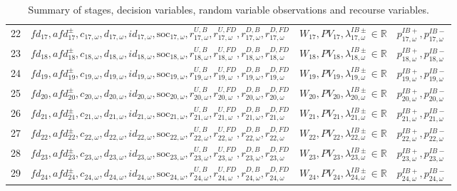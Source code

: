 \documentclass{article}
\newcommand{\R}{\mathbb{R}}
\newcommand{\soc}{\text{soc}}
\begin{document}
\begin{table}
\begin{tabular}{c c c c}
	22 & $fd_{17}, afd^{\pm}_{17}, c_{17, \omega}, d_{17, \omega}, id_{17, \omega}, \soc_{17, \omega}, r^{U, B}_{17, \omega}, r^{U, FD}_{17, \omega}, r^{D, B}_{17, \omega}, r^{D, FD}_{17, \omega}$ & $W_{17}, PV_{17}, \lambda^{IB\pm}_{17, \omega} \in \R$ & $p^{IB+}_{17, \omega}, p^{IB-}_{17, \omega}$ \\
	23 & $fd_{18}, afd^{\pm}_{18}, c_{18, \omega}, d_{18, \omega}, id_{18, \omega}, \soc_{18, \omega}, r^{U, B}_{18, \omega}, r^{U, FD}_{18, \omega}, r^{D, B}_{18, \omega}, r^{D, FD}_{18, \omega}$ & $W_{18}, PV_{18}, \lambda^{IB\pm}_{18, \omega} \in \R$ &  $p^{IB+}_{18, \omega}, p^{IB-}_{18, \omega}$ \\
	24 & $fd_{19}, afd^{\pm}_{19}, c_{19, \omega}, d_{19, \omega}, id_{19, \omega}, \soc_{19, \omega}, r^{U, B}_{19, \omega}, r^{U, FD}_{19, \omega}, r^{D, B}_{19, \omega}, r^{D, FD}_{19, \omega}$ & $W_{19}, PV_{19}, \lambda^{IB\pm}_{19, \omega} \in \R$ & $p^{IB+}_{19, \omega}, p^{IB-}_{19, \omega}$ \\
	25 & $fd_{20}, afd^{\pm}_{20}, c_{20, \omega}, d_{20, \omega}, id_{20, \omega}, \soc_{20, \omega}, r^{U, B}_{20, \omega}, r^{U, FD}_{20, \omega}, r^{D, B}_{20, \omega}, r^{D, FD}_{20, \omega}$  & $W_{20}, PV_{20}, \lambda^{IB\pm}_{20, \omega} \in \R$ & $p^{IB+}_{20, \omega}, p^{IB-}_{20, \omega}$ \\
	26 & $fd_{21}, afd^{\pm}_{21}, c_{21, \omega}, d_{21, \omega}, id_{21, \omega}, \soc_{21, \omega}, r^{U, B}_{21, \omega}, r^{U, FD}_{21, \omega}, r^{D, B}_{21, \omega}, r^{D, FD}_{21, \omega}$ & $W_{21}, PV_{21}, \lambda^{IB\pm}_{21, \omega} \in \R$ & $p^{IB+}_{21, \omega}, p^{IB-}_{21, \omega}$ \\
	27 & $fd_{22}, afd^{\pm}_{22}, c_{22, \omega}, d_{22, \omega}, id_{22, \omega}, \soc_{22, \omega}, r^{U, B}_{22, \omega}, r^{U, FD}_{22, \omega}, r^{D, B}_{22, \omega}, r^{D, FD}_{22, \omega}$ & $W_{22}, PV_{22}, \lambda^{IB\pm}_{22, \omega} \in \R$ & $p^{IB+}_{22, \omega}, p^{IB-}_{22, \omega}$ \\
	28 & $fd_{23}, afd^{\pm}_{23}, c_{23, \omega}, d_{23, \omega}, id_{23, \omega}, \soc_{23, \omega}, r^{U, B}_{23, \omega}, r^{U, FD}_{23, \omega}, r^{D, B}_{23, \omega}, r^{D, FD}_{23, \omega}$ & $W_{23}, PV_{23}, \lambda^{IB\pm}_{23, \omega} \in \R$ & $p^{IB+}_{23, \omega}, p^{IB-}_{23, \omega}$ \\
	29 & $fd_{24}, afd^{\pm}_{24}, c_{24, \omega}, d_{24, \omega}, id_{24, \omega}, \soc_{24, \omega}, r^{U, B}_{24, \omega}, r^{U, FD}_{24, \omega}, r^{D, B}_{24, \omega}, r^{D, FD}_{24, \omega}$ & $W_{24}, PV_{24}, \lambda^{IB\pm}_{24, \omega} \in \R$ & $p^{IB+}_{24, \omega}, p^{IB-}_{24, \omega}$ \\

\end{tabular}


\caption{Summary of stages, decision variables, random variable observations and recourse variables.}
\label{TABLE:stages-rv-dv}
\end{table}



\printbibliography
\end{document}
